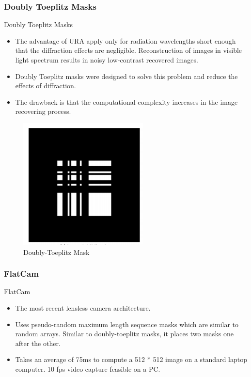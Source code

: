 \documentclass{beamer}
\begin{document}
\subsubsection[]{Doubly Toeplitz Masks}
\begin{frame}{Doubly Toeplitz Masks}
\begin{itemize}
\item The advantage of URA apply only for radiation wavelengths short enough that the diffraction effects are negligible. Reconstruction of images in visible light spectrum results in noisy low-contrast recovered images\cite{Toeplitz}.
\item Doubly Toeplitz masks were designed to solve this problem and reduce the effects of diffraction.
\item The drawback is that the computational complexity increases in the image recovering process.
\end{itemize}
\begin{figure}{
\includegraphics[scale=0.35]{doc_images/lensless_6.PNG}
\caption{Doubly-Toeplitz Mask\cite{Toeplitz}}}
\end{figure}
\end{frame}
\subsubsection[]{FlatCam}
\begin{frame}{FlatCam}
\begin{itemize}
\item The most recent lensless camera architecture\cite{VBoomi}\cite{FlatCam}.
\item Uses pseudo-random maximum length sequence masks which are similar to random arrays. Similar to doubly-toeplitz masks, it places two masks one after the other.
\item Takes an average of 75ms to compute a 512 * 512 image on a standard laptop computer. 10 fps video capture feasible on a PC.
\end{itemize}

\end{frame}
\end{document}
